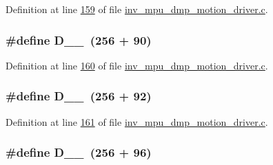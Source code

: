 Definition at line \hyperlink{inv__mpu__dmp__motion__driver_8c_source_l00159}{159} of file \hyperlink{inv__mpu__dmp__motion__driver_8c_source}{inv\+\_\+mpu\+\_\+dmp\+\_\+motion\+\_\+driver.\+c}.

\subsubsection[{\texorpdfstring{D\+\_\+1\+\_\+90}{D_1_90}}]{\setlength{\rightskip}{0pt plus 5cm}\#define D\+\_\+\_~(256 + 90)}\hypertarget{group___d_r_i_v_e_r_s_ga63bb29a8be69128a60f4716aacc447a8}{}\label{group___d_r_i_v_e_r_s_ga63bb29a8be69128a60f4716aacc447a8}


Definition at line \hyperlink{inv__mpu__dmp__motion__driver_8c_source_l00160}{160} of file \hyperlink{inv__mpu__dmp__motion__driver_8c_source}{inv\+\_\+mpu\+\_\+dmp\+\_\+motion\+\_\+driver.\+c}.

\subsubsection[{\texorpdfstring{D\+\_\+1\+\_\+92}{D_1_92}}]{\setlength{\rightskip}{0pt plus 5cm}\#define D\+\_\+\_~(256 + 92)}\hypertarget{group___d_r_i_v_e_r_s_gabd8a1ea9b71ac9389116a33e317aad6c}{}\label{group___d_r_i_v_e_r_s_gabd8a1ea9b71ac9389116a33e317aad6c}


Definition at line \hyperlink{inv__mpu__dmp__motion__driver_8c_source_l00161}{161} of file \hyperlink{inv__mpu__dmp__motion__driver_8c_source}{inv\+\_\+mpu\+\_\+dmp\+\_\+motion\+\_\+driver.\+c}.

\subsubsection[{\texorpdfstring{D\+\_\+1\+\_\+96}{D_1_96}}]{\setlength{\rightskip}{0pt plus 5cm}\#define D\+\_\+\_~(256 + 96)}\hypertarget{group___d_r_i_v_e_r_s_ga9deaa01235044f6470a4269db6b624ea}{}\label{group___d_r_i_v_e_r_s_ga9deaa01235044f6470a4269db6b624ea}


